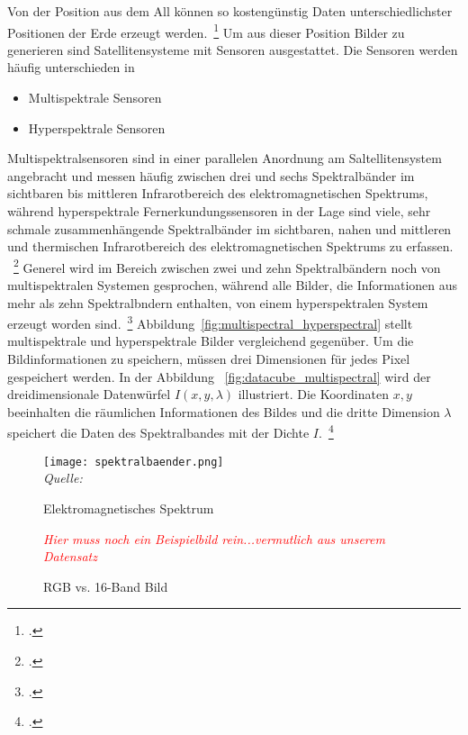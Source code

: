 Von der Position aus dem All können so kostengünstig Daten unterschiedlichster Positionen der Erde erzeugt
werden.~\footcite[\vglf][]{landgrebe.1997}
Um aus dieser Position Bilder zu generieren sind Satellitensysteme mit Sensoren ausgestattet.
Die Sensoren werden häufig unterschieden in
\begin {itemize}
    \item Multispektrale Sensoren
    \item Hyperspektrale Sensoren
\end {itemize}
Multispektralsensoren sind in einer parallelen Anordnung am Saltellitensystem angebracht und messen häufig zwischen drei
und sechs Spektralbänder im sichtbaren bis mittleren Infrarotbereich des elektromagnetischen Spektrums, während
hyperspektrale Fernerkundungssensoren in der Lage sind viele, sehr schmale zusammenhängende Spektralbänder im
sichtbaren, nahen und mittleren und thermischen Infrarotbereich des elektromagnetischen Spektrums zu erfassen.
~\footcite[\vglf][]{govender.2007}
Generel wird im Bereich zwischen zwei und zehn Spektralbändern noch von multispektralen Systemen gesprochen, während
alle Bilder, die Informationen aus mehr als zehn Spektralbndern enthalten, von einem hyperspektralen System erzeugt
worden sind.~\footcite[\vglf][]{ibraheem.2015}
Abbildung~\ref{fig:multispectral_hyperspectral} stellt multispektrale und hyperspektrale Bilder vergleichend gegenüber.
Um die Bildinformationen zu speichern, müssen drei Dimensionen für jedes Pixel gespeichert werden.
In der Abbildung ~\ref{fig:datacube_multispectral} wird der dreidimensionale Datenwürfel \(I(x,y,\lambda)\) illustriert.
Die Koordinaten \(x,y\) beeinhalten die räumlichen Informationen des Bildes und die dritte Dimension \(\lambda\)
speichert die Daten des Spektralbandes mit der Dichte \(I\).~\footcite[\vglf][]{ibraheem.2015}

\begin{figure}[H]
    \caption {Elektromagnetisches Spektrum} \label{fig:Spektrum}
    \texttt{[image: spektralbaender.png]}
    \\
    \textit{Quelle:~\cite[][]{ditzinger.2013}}
\\
\end{figure}

\begin{figure}[H]
    \caption {RGB vs. 16-Band Bild}\label{fig:RGB_vs_16_Band}
    \textcolor{red}{\textit{Hier muss noch ein Beispielbild rein...vermutlich aus unserem Datensatz}}
    \\
\end{figure}

